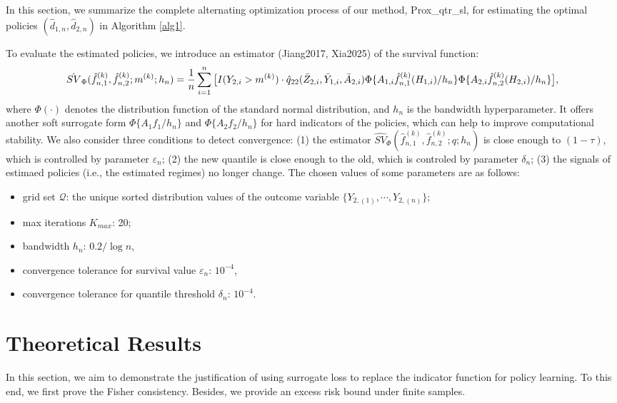 \documentclass[10pt]{article}
\theoremstyle{remark} \newtheorem{rem}{Remark}
\begin{document}
In this section, we summarize the complete alternating optimization process of our method, Prox\_qtr\_sl, for estimating the optimal policies $(\hat d_{1,n}, \hat d_{2,n})$ in Algorithm \ref{alg1}. 

To evaluate the estimated policies, we introduce an estimator (Jiang2017, Xia2025) of the survival function:
\begin{align}
    \hat{SV}_{\Phi}(\hat{f}_{n,1}^{(k)},\hat{f}_{n,2}^{(k)};m^{(k)};{h_n}) = \frac{1}{n} \sum_{i=1}^n  \big[I(Y_{2,i}>m^{(k)}) \cdot \hat q_{22}(\bar Z_{2,i}, \bar Y_{1,i}, \bar A_{2,i}) \Phi\{A_{1,i}\hat{f}_{n,1}^{(k)}(H_{1,i})/h_n\}\Phi\{A_{2,i}\hat{f}_{n,2}^{(k)}(H_{2,i})/h_n\} \big], \notag
\end{align}
where $\Phi(\cdot)$ denotes the distribution function of the standard normal distribution, and $h_n$ is the bandwidth hyperparameter.
It offers another soft surrogate form $\Phi\{A_{1}f_{1}/h_n\}$ and $\Phi\{A_{2}f_{2}/h_n\}$
for hard indicators of the policies, which can help to improve computational stability.
We also consider three conditions to detect convergence: (1) the estimator $\hat{SV}_{\Phi}(\hat{f}_{n,1}^{(k)},\hat{f}_{n,2}^{(k)};q;{h_n})$ is close enough to $(1-\tau)$, which is controlled by parameter $\varepsilon_n$; (2) the new quantile is close enough to the old, which is controled by parameter $\delta_n$; (3) the signals of estimaed policies (i.e., the estimated regimes) no longer change.
The chosen values of some parameters are as follows:
\begin{itemize}
    \item grid set $\mathcal{Q}$: the unique sorted distribution values of the outcome variable $\{Y_{2,(1)},\cdots,Y_{2,(n)}\}$;
    \item max iterations $K_{max}$: 20;
    \item bandwidth $h_n$:  $0.2/\log n$,
    \item convergence tolerance for survival value $\varepsilon_n$: $10^{-4}$,
    \item convergence tolerance for quantile threshold $\delta_n$: $10^{-4}$.
\end{itemize}




\section{Theoretical Results}
In this section, we aim to demonstrate the justification of using surrogate loss to replace the indicator function for policy learning.
To this end, we first prove the Fisher consistency.
Besides, we provide an excess risk bound under finite samples.
\end{document}
